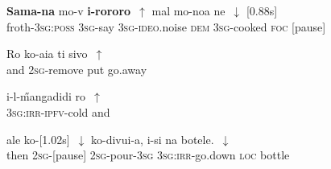 \documentclass[output=paper]{LSP/langsci}
\begin{document}
  \begin{appendixexe}
\ex \label{Guapp24}
\gll     \textbf{Sama-na}   mo-v            \textbf{i-rororo}~$\uparrow$    mal  mo-noa         ne~$\downarrow$   [0.88s]   \\     	       
 froth-\textsc{3sg:poss}  \textsc{3sg}-say   \textsc{3sg}-\textsc{ideo}.noise \textsc{dem}  \textsc{3sg}-cooked   \textsc{foc} [pause] \\
\glt {} 
\end{appendixexe}


  \begin{appendixexe}
\ex
\gll     Ro     ko-aia         ti    sivo~$\uparrow$    \\     	       
 and   \textsc{2sg}-remove   put   go.away \\
\glt {} 
\label{Guapp25}
\end{appendixexe}

  \begin{appendixexe}
\ex
\gll    i-l-\H{m}angadidi               ro~$\uparrow$  \\     	 
 \textsc{3sg:irr-ipfv}-cold        and\\
\glt {} 
\label{Guapp26}
\end{appendixexe}

  \begin{appendixexe}
\ex \label{Guapp27}
\gll   ale    ko-[1.02s]~$\downarrow$      ko-divui-a,  i-si                 na   botele.~$\downarrow$  \\     	       
 then   \textsc{2sg}-[pause]      \textsc{2sg}-pour-\textsc{3sg}  \textsc{3sg:irr}-go.down   \textsc{loc}  bottle\\
\glt {} 
\end{appendixexe}
\end{document}
